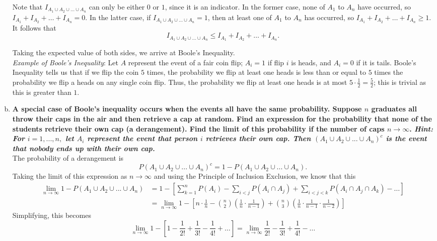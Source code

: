 \begin{enumerate}[a)]
    Note that $I_{A_1 \cup A_2 \cup \dots \cup A_n}$ can only be either $0$ or $1$, since it is an indicator. 
    In the former case, none of $A_1$ to $A_n$ have occurred, so $I_{A_1} + I_{A_2} + \dots + I_{A_n} = 0$. 
    In the latter case, if $I_{A_1 \cup A_2 \cup \dots \cup A_n} = 1$, then at least one of $A_1$ to $A_n$ has occurred, 
    so $I_{A_1} + I_{A_2} + \dots + I_{A_n} \geq 1$. \\

    It follows that 
    \[
        I_{A_1 \cup A_2 \cup \dots \cup A_n} \leq I_{A_1} + I_{A_2} + \dots + I_{A_n}.
    \]

    Taking the expected value of both sides, we arrive at Boole's Inequality. \\
    
    \textit{Example of Boole's Inequality}: Let $A$ represent the event of a fair coin flip; $A_i = 1$ if flip $i$ is heads, and $A_i = 0$ if it is tails. 
    Boole's Inequality tells us that if we flip the coin $5$ times, the probability we flip at least one heads is less than or equal to $5$ times the probability we flip a heads on any single coin flip. 
    Thus, the probability we flip at least one heads is at most $5 \cdot \frac{1}{2} = \frac{5}{2}$; this is trivial as this is greater than $1.$

    \item \textbf{A special case of Boole's inequality occurs when the events all have the same probability. 
    Suppose $n$ graduates all throw their caps in the air and then retrieve a cap at random. 
    Find an expression for the probability that none of the students retrieve their own cap (a derangement). 
    Find the limit of this probability if the number of caps $n \rightarrow \infty$. \textit{Hint: For $i = 1, . . . , n,$ let $A_{i}$ represent the event that person $i$ retrieves their own cap. 
    Then $(A_1 \cup A_{2} \cup . . . \cup A_{n})^{c}$ is the event that nobody ends up with their own cap.}} \\
    The probability of a derangement is
    \[
        P(A_{1} \cup A_{2} \cup . . . \cup A_{n})^{c} = 1 - P(A_{1} \cup A_{2} \cup . . . \cup A_{n}).\] 
    Taking the limit of this expression as $n \rightarrow \infty$ and using the Principle of Inclusion Exclusion, we know that this
    \begin{align*}
    \lim\limits_{n \rightarrow \infty} 1 - P(A_{1} \cup A_{2} \cup . . . \cup A_{n}) &= 1 - \left[\sum\limits^{n}_{k=1}P(A_{i}) - \sum\limits_{i<j}P(A_{i} \cap A_{j}) + \sum\limits_{i<j<k}P(A_{i} \cap A_{j} \cap A_{k}) - \dots\right] \\
    &= \lim\limits_{n \rightarrow \infty} 1 - \left[n \cdot \frac{1}{n} - \binom{n}{2} \left(\frac{1}{n} \cdot \frac{1}{n-1} \right) + \binom{n}{3} \left(\frac{1}{n} \cdot \frac{1}{n-1} \cdot \frac{1}{n-2} \right)  \right]
    \end{align*}
    Simplifying, this becomes
    \[
        \lim\limits_{n \rightarrow \infty}1- \left[ 1 - \frac{1}{2!} + \frac{1}{3!} - \frac{1}{4!} + \dots \right] = \lim\limits_{n \rightarrow \infty} \frac{1}{2!} - \frac{1}{3!} + \frac{1}{4!} - \dots
    \]
    

\end{enumerate}
